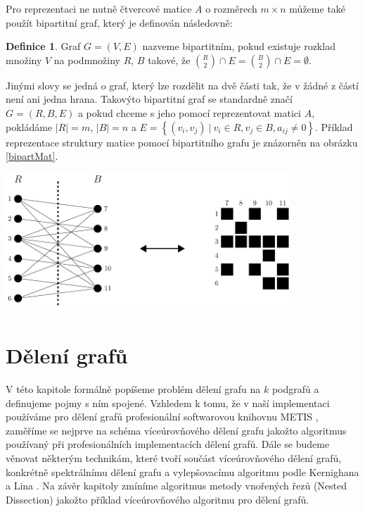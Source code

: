 \documentclass{ctuthesis}
\theoremstyle{plain}
\theoremstyle{definition}
\newtheorem{definition}{Definice}
\begin{document}
Pro reprezentaci ne nutně čtvercové matice $A$ o rozměrech $m\times n$ můžeme také použít bipartitní graf, který je definován následovně:

\begin{definition}
  Graf $G=(V,E)$ nazveme bipartitním, pokud existuje rozklad množiny $V$ na podmnožiny $R$, $B$ takové, že ${R \choose 2} \cap E = {B \choose 2} \cap E = \emptyset$.
\end{definition}

Jinými slovy se jedná o graf, který lze rozdělit na dvě části tak, že v žádné z částí není ani jedna hrana. Takovýto bipartitní graf se standardně značí $G=(R,B,E)$ a pokud chceme s jeho pomocí reprezentovat matici $A$, pokládáme $|R|=m$, $|B|=n$ a $E = \left\{(v_i,v_j) \ | \ v_i \in R, v_j \in B, a_{ij} \neq 0 \right\}$. Příklad reprezentace struktury matice pomocí bipartitního grafu je znázorněn na obrázku \ref{bipartMat}.

\bigskip
{
  \centering
  \includegraphics[width=0.8\textwidth]{pictures/bipart_grmat.pdf}
}


\chapter{Dělení grafů}

V této kapitole formálně popíšeme problém dělení grafu na $k$ podgrafů a definujeme pojmy s ním spojené. Vzhledem k tomu, že v naší implementaci používáme pro dělení grafů profesionální softwarovou knihovnu METIS \cite{kary:13}, zaměříme se nejprve na schéma víceúrovňového dělení grafu jakožto algoritmus používaný při profesionálních implementacích dělení grafů. Dále se budeme věnovat některým technikám, které tvoří součást víceúrovňového dělení grafů, konkrétně spektrálnímu dělení grafu a vylepšovacímu algoritmu podle Kernighana a Lina \cite{keli:70}. Na závěr kapitoly zmíníme algoritmus metody vnořených řezů (Nested Dissection) jakožto příklad víceúrovňového algoritmu pro dělení grafů.
\end{document}
